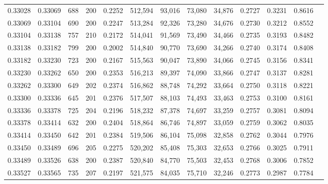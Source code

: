 \begin{tabular}{rrrrrrrrrrrrr}
0.33028 & 0.33069 &   688 & 200 &                                     0.2252 & 512,594 &  93,016 &  73,080 &  34,876 & 0.2727 & 0.3231 & 0.8616 \\
0.33069 & 0.33104 &   690 & 200 &                                     0.2247 & 513,284 &  92,326 &  73,280 &  34,676 & 0.2730 & 0.3212 & 0.8552 \\
0.33104 & 0.33138 &   757 & 210 &                                     0.2172 & 514,041 &  91,569 &  73,490 &  34,466 & 0.2735 & 0.3193 & 0.8482 \\
0.33138 & 0.33182 &   799 & 200 &                                     0.2002 & 514,840 &  90,770 &  73,690 &  34,266 & 0.2740 & 0.3174 & 0.8408 \\
0.33182 & 0.33230 &   723 & 200 &                                     0.2167 & 515,563 &  90,047 &  73,890 &  34,066 & 0.2745 & 0.3156 & 0.8341 \\
0.33230 & 0.33262 &   650 & 200 &                                     0.2353 & 516,213 &  89,397 &  74,090 &  33,866 & 0.2747 & 0.3137 & 0.8281 \\
0.33262 & 0.33300 &   649 & 202 &                                     0.2374 & 516,862 &  88,748 &  74,292 &  33,664 & 0.2750 & 0.3118 & 0.8221 \\
0.33300 & 0.33336 &   645 & 201 &                                     0.2376 & 517,507 &  88,103 &  74,493 &  33,463 & 0.2753 & 0.3100 & 0.8161 \\
0.33336 & 0.33378 &   725 & 204 &                                     0.2196 & 518,232 &  87,378 &  74,697 &  33,259 & 0.2757 & 0.3081 & 0.8094 \\
0.33378 & 0.33414 &   632 & 200 &                                     0.2404 & 518,864 &  86,746 &  74,897 &  33,059 & 0.2759 & 0.3062 & 0.8035 \\
0.33414 & 0.33450 &   642 & 201 &                                     0.2384 & 519,506 &  86,104 &  75,098 &  32,858 & 0.2762 & 0.3044 & 0.7976 \\
0.33450 & 0.33489 &   696 & 205 &                                     0.2275 & 520,202 &  85,408 &  75,303 &  32,653 & 0.2766 & 0.3025 & 0.7911 \\
0.33489 & 0.33526 &   638 & 200 &                                     0.2387 & 520,840 &  84,770 &  75,503 &  32,453 & 0.2768 & 0.3006 & 0.7852 \\
0.33527 & 0.33565 &   735 & 207 &                                     0.2197 & 521,575 &  84,035 &  75,710 &  32,246 & 0.2773 & 0.2987 & 0.7784 \\

\end{tabular}
